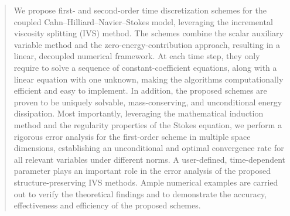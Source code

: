 \author{
	Baolin Kuang    \and
	Hongfei Fu$^*$ \and 
	Xiaoli Li 
}



\date{Received: date / Accepted: date}

\maketitle
\begin{abstract} 
 We propose first- and second-order time discretization schemes for the coupled Cahn--Hilliard--Navier--Stokes model, leveraging the incremental viscosity splitting (IVS) method. The schemes combine the scalar auxiliary variable method and the zero-energy-contribution approach, resulting in a linear,  decoupled numerical framework. At each time step, they only require to solve a sequence of constant-coefficient equations, along with a linear equation with one unknown, making the algorithms computationally efficient and easy to implement. In addition, the proposed schemes are proven to be uniquely solvable, mass-conserving, and unconditional energy dissipation. Most importantly, leveraging the mathematical induction method and the regularity properties of the Stokes equation, we perform a rigorous error analysis for the first-order scheme in multiple space dimensions, establishing an unconditional and optimal convergence rate for all relevant variables under different norms. A user-defined, time-dependent parameter plays an important role in the error analysis of the proposed structure-preserving IVS methods. Ample numerical examples are carried out to verify the theoretical findings and to demonstrate the accuracy, effectiveness  and efficiency of the proposed schemes. 
\end{abstract}
%
%
%
%
 


